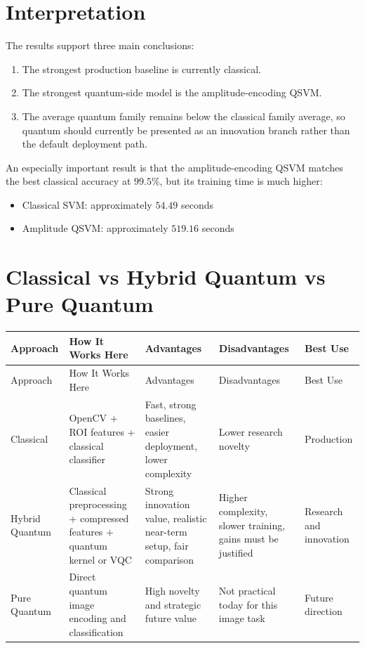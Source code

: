 \documentclass[12pt,a4paper]{article}
\begin{document}
\section{Interpretation}

The results support three main conclusions:

\begin{enumerate}
  \item The strongest production baseline is currently classical.
  \item The strongest quantum-side model is the amplitude-encoding QSVM.
  \item The average quantum family remains below the classical family average, so quantum should currently be presented as an innovation branch rather than the default deployment path.
\end{enumerate}

An especially important result is that the amplitude-encoding QSVM matches the best classical accuracy at \(99.5\%\), but its training time is much higher:

\begin{itemize}
  \item Classical SVM: approximately \(54.49\) seconds
  \item Amplitude QSVM: approximately \(519.16\) seconds
\end{itemize}

\section{Classical vs Hybrid Quantum vs Pure Quantum}

\begin{longtable}{p{2.2cm}p{3.4cm}p{3.4cm}p{3.4cm}p{2.2cm}}
\toprule
Approach & How It Works Here & Advantages & Disadvantages & Best Use \\
\midrule
\endfirsthead
\toprule
Approach & How It Works Here & Advantages & Disadvantages & Best Use \\
\midrule
\endhead
Classical & OpenCV + ROI features + classical classifier & Fast, strong baselines, easier deployment, lower complexity & Lower research novelty & Production \\
Hybrid Quantum & Classical preprocessing + compressed features + quantum kernel or VQC & Strong innovation value, realistic near-term setup, fair comparison & Higher complexity, slower training, gains must be justified & Research and innovation \\
Pure Quantum & Direct quantum image encoding and classification & High novelty and strategic future value & Not practical today for this image task & Future direction \\
\bottomrule
\end{longtable}
\end{document}
